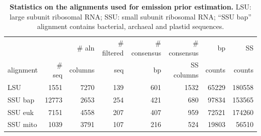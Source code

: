 \documentclass[11pt]{article}
\begin{document}
\begin{table}
\begin{center}
\begin{tabular}{lrrrrrrr} 
& & \# aln & \# filtered & \# consensus & \# consensus & bp & SS \\
alignment & \# seq & columns & seq & bp & SS columns & counts & counts \\ \hline
LSU & 1551 & 7270 & 139 & 601 & 1532 & 65229 & 180558  \\
SSU bap & 12773 & 2653 & 254 & 421 & 680 & 97834 & 153565 \\
SSU euk & 7151 & 4558 & 207 & 407 & 959 & 72521 & 174260 \\
SSU mito & 1039 & 3791 & 107 & 216 & 524 & 19803 & 56510 \\ 
\end{tabular}
\caption{\textbf{Statistics on the alignments used for emission prior
    estimation.} LSU: large subunit ribosomal RNA; SSU: small subunit
    ribosomal RNA; ``SSU bap'' alignment contains bacterial, archaeal
    and plastid sequences.}
\label{tbl:emissioncounts}
\end{center}
\end{table}
\end{document}
